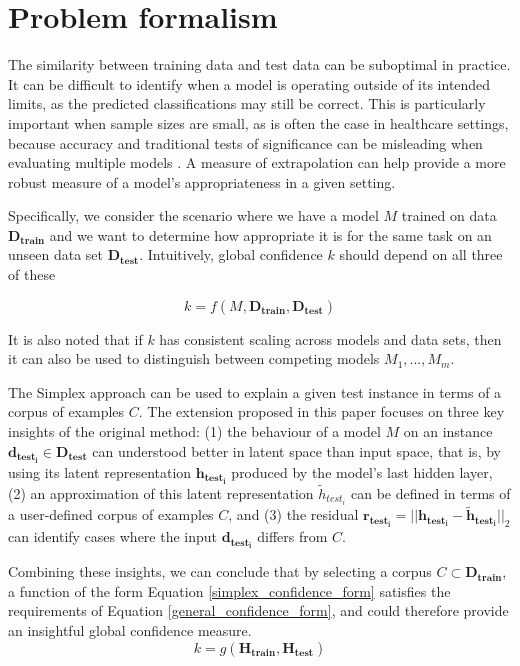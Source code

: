 \documentclass{article}
\begin{document}
\section{Problem formalism}

The similarity between training data and test data can be suboptimal in practice. It can be difficult to identify when a model is operating outside of its intended limits, as the predicted classifications may still be correct. This is particularly important when sample sizes are small, as is often the case in healthcare settings, because accuracy and traditional tests of significance can be misleading when evaluating multiple models \cite{harvey_multiple_2013}. A measure of extrapolation can help provide a more robust measure of a model's appropriateness in a given setting.

Specifically, we consider the scenario where we have a model $M$ trained on data $\bm{D_{train}}$ and we want to determine how appropriate it is for the same task on an unseen data set $\bm{D_{test}}$. Intuitively, global confidence $k$ should depend on all three of these

\begin{equation}\label{general_confidence_form}
	k = f(M, \bm{D_{train}}, \bm{D_{test}})
\end{equation}

It is also noted that if $k$ has consistent scaling across models and data sets, then it can also be used to distinguish between competing models ${M_1, ..., M_m}$.

The Simplex approach can be used to explain a given test instance in terms of a corpus of examples $C$. The extension proposed in this paper focuses on three key insights of the original method: (1) the behaviour of a model $M$ on an instance $\bm{d_{test_i}} \in \bm{D_{test}}$ can understood better in latent space than input space, that is, by using its latent representation $\bm{h_{test_i}}$ produced by the model's last hidden layer, (2) an approximation of this latent representation $\tilde{h}_{test_i}$  can be defined in terms of a user-defined corpus of examples $C$, and (3) the residual $\bm{r_{test_i}} = ||\bm{h_{test_i}} - \bm{\tilde{h}_{test_i}}||_2$ can identify cases where the input $\bm{d_{test_i}}$ differs from $C$.

Combining these insights, we can conclude that by selecting a corpus $C \subset \bm{D_{train}}$, a function of the form Equation \ref{simplex_confidence_form} satisfies the requirements of Equation \ref{general_confidence_form}, and could therefore provide an insightful global confidence measure.
\begin{equation}\label{simplex_confidence_form}
	k = g(\bm{H_{train}}, \bm{H_{test}})
\end{equation}
\end{document}
